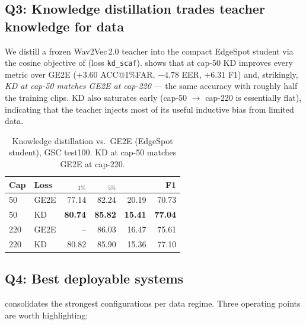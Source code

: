 \documentclass[10pt,twocolumn]{article}
\newcommand{\best}[1]{\textbf{#1}}
\newcommand{\acc}{\text{ACC}}
\newcommand{\eer}{\text{EER}}
\newcommand{\code}[1]{\texttt{\small #1}}
\begin{document}
\subsection{Q3: Knowledge distillation trades teacher knowledge for data}
\label{sec:kd}

We distill a frozen Wav2Vec\,2.0 teacher into the compact EdgeSpot student via the
cosine objective of  (loss \code{kd\_scaf}).  shows
that at cap-50 KD improves every metric over GE2E ($+3.60$ ACC@1\%FAR,
$-4.78$ EER, $+6.31$ F1) and, strikingly, \emph{KD at cap-50 matches GE2E at
cap-220} --- the same accuracy with roughly half the training clips. KD also
saturates early (cap-50 $\to$ cap-220 is essentially flat), indicating that the
teacher injects most of its useful inductive bias from limited data.

\begin{table}[t]
\centering
\caption{Knowledge distillation vs.\ GE2E (EdgeSpot student), GSC test100.
KD at cap-50 matches GE2E at cap-220.}
\label{tab:kd}
\footnotesize
\setlength{\tabcolsep}{3.5pt}
\begin{tabular}{l l r r r r}
\toprule
\textbf{Cap} & \textbf{Loss} & \acc$_{1\%}$ & \acc$_{5\%}$ & \eer & F1\\
\midrule
50  & GE2E       & 77.14 & 82.24 & 20.19 & 70.73 \\
\rowcolor{blue!7}
50  & KD         & \best{80.74} & \best{85.82} & \best{15.41} & \best{77.04} \\
220 & GE2E       & {--} & 86.03 & 16.47 & 75.61 \\
220 & KD         & 80.82 & 85.90 & 15.36 & 77.10 \\
\bottomrule
\end{tabular}
\end{table}

\subsection{Q4: Best deployable systems}
\label{sec:best}

 consolidates the strongest configurations per data regime.
Three operating points are worth highlighting:
\end{document}
